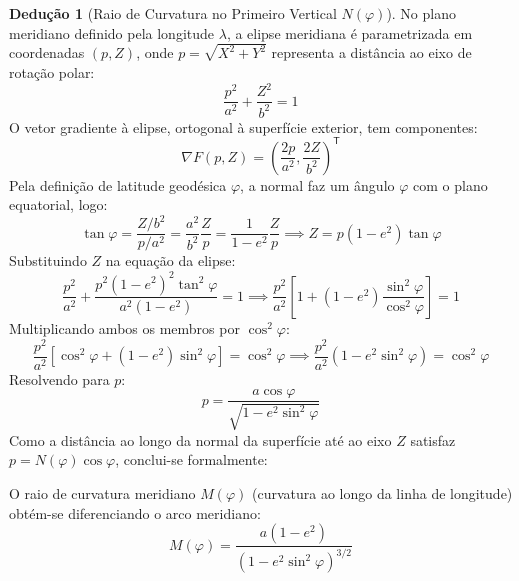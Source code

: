 \documentclass[11pt,a4paper]{article}
\newcommand{\T}{^{\mathsf{T}}}
\theoremstyle{definition}
\newtheorem{deducao}{Dedução}[section]
\newcommand{\caixaresultado}[1]{\begin{center}\fbox{\parbox{0.92\textwidth}{#1}}\end{center}}
\begin{document}
\begin{deducao}[Raio de Curvatura no Primeiro Vertical $N(\varphi)$]
No plano meridiano definido pela longitude $\lambda$, a elipse meridiana é parametrizada em coordenadas $(p, Z)$, onde $p = \sqrt{X^2 + Y^2}$ representa a distância ao eixo de rotação polar:
\begin{equation}
    \frac{p^2}{a^2} + \frac{Z^2}{b^2} = 1
\end{equation}
O vetor gradiente à elipse, ortogonal à superfície exterior, tem componentes:
\begin{equation}
    \nabla F(p, Z) = \left( \frac{2p}{a^2}, \frac{2Z}{b^2} \right)\T
\end{equation}
Pela definição de latitude geodésica $\varphi$, a normal faz um ângulo $\varphi$ com o plano equatorial, logo:
\begin{equation}
    \tan\varphi = \frac{Z / b^2}{p / a^2} = \frac{a^2}{b^2} \frac{Z}{p} = \frac{1}{1 - e^2} \frac{Z}{p} \implies Z = p(1 - e^2)\tan\varphi
\end{equation}
Substituindo $Z$ na equação da elipse:
\begin{equation}
    \frac{p^2}{a^2} + \frac{p^2(1 - e^2)^2 \tan^2\varphi}{a^2(1 - e^2)} = 1 \implies \frac{p^2}{a^2} \left[ 1 + (1 - e^2)\frac{\sin^2\varphi}{\cos^2\varphi} \right] = 1
\end{equation}
Multiplicando ambos os membros por $\cos^2\varphi$:
\begin{equation}
    \frac{p^2}{a^2} \left[ \cos^2\varphi + (1 - e^2)\sin^2\varphi \right] = \cos^2\varphi \implies \frac{p^2}{a^2} (1 - e^2 \sin^2\varphi) = \cos^2\varphi
\end{equation}
Resolvendo para $p$:
\begin{equation}
    p = \frac{a \cos\varphi}{\sqrt{1 - e^2 \sin^2\varphi}}
\end{equation}
Como a distância ao longo da normal da superfície até ao eixo $Z$ satisfaz $p = N(\varphi)\cos\varphi$, conclui-se formalmente:
\caixaresultado{
\begin{equation}
    N(\varphi) = \frac{a}{\sqrt{1 - e^2 \sin^2\varphi}}
\end{equation}
}
\end{deducao}

O raio de curvatura meridiano $M(\varphi)$ (curvatura ao longo da linha de longitude) obtém-se diferenciando o arco meridiano:
\begin{equation}
    M(\varphi) = \frac{a(1 - e^2)}{(1 - e^2 \sin^2\varphi)^{3/2}}
\end{equation}
\end{document}
